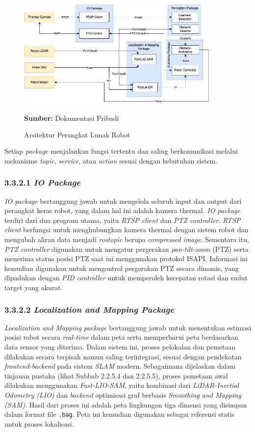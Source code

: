 \begin{figure}[H]
  \centering
  \includegraphics[width=0.9\textwidth]{gambar/bab3/sftware-arch.png}
  \caption{Arsitektur Perangkat Lunak Robot}
  \label{fig:software-arch}
  \footnotesize{\textbf{Sumber:} Dokumentasi Pribadi}
\end{figure}

Setiap \textit{package} menjalankan fungsi tertentu dan saling berkomunikasi melalui mekanisme \textit{topic}, \textit{service}, atau \textit{action} sesuai dengan kebutuhan sistem.

\subsubsection{3.3.2.1 \emph{IO Package}}
\textit{IO package} bertanggung jawab untuk mengelola seluruh input dan output dari perangkat keras robot, yang dalam hal ini adalah kamera thermal. \textit{IO package} terdiri dari dua program utama, yaitu \textit{RTSP client} dan \textit{PTZ controller}.  \textit{RTSP client} berfungsi untuk menghubungkan kamera thermal dengan sistem robot dan mengubah aliran data menjadi \textit{rostopic} berupa \textit{compressed image}. Sementara itu, \textit{PTZ controller} digunakan untuk mengatur pergerakan \textit{pan-tilt-zoom} (PTZ) serta menerima status posisi PTZ saat ini menggunakan protokol ISAPI. Informasi ini kemudian digunakan untuk mengontrol pergerakan PTZ secara dinamis, yang dipadukan dengan \textit{PID controller} untuk memperoleh kecepatan rotasi dan sudut target yang akurat.

\subsubsection{3.3.2.2 \emph{Localization and Mapping Package}}
\emph{Localization and Mapping package} bertanggung jawab untuk menentukan estimasi posisi robot secara \emph{real-time} dalam peta serta memperbarui peta berdasarkan data sensor yang diterima. Dalam sistem ini, proses pelokalan dan pemetaan dilakukan secara terpisah namun saling terintegrasi, sesuai dengan pendekatan \emph{frontend-backend} pada sistem \emph{SLAM} modern. Sebagaimana dijelaskan dalam tinjauan pustaka (lihat Subbab 2.2.5.4 dan 2.2.5.5), proses pemetaan awal dilakukan menggunakan \emph{Fast-LIO-SAM}, yaitu kombinasi dari \emph{LiDAR-Inertial Odometry (LIO)} dan \emph{backend} optimisasi graf berbasis \emph{Smoothing and Mapping (SAM)}. Hasil dari proses ini adalah peta lingkungan tiga dimensi yang disimpan dalam format file \texttt{.bag}. Peta ini kemudian digunakan sebagai referensi statis untuk proses lokalisasi.

